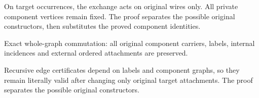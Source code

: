 On target occurrences, the exchange acts on original wires only. All
private component vertices remain fixed.
The proof separates the possible original constructors, then substitutes the proved component identities.
\par{}

Exact whole-graph commutation: all original component carriers, labels,
internal incidences and external ordered attachments are preserved.
\par{}

Recursive edge certificates depend on labels and component graphs, so
they remain literally valid after changing only original target attachments.
The proof separates the possible original constructors.
\par{}

